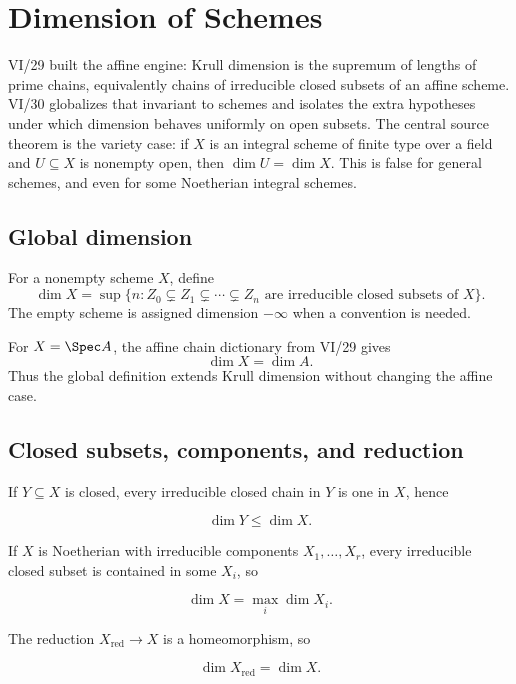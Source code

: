 \chapter{Dimension of Schemes}\label{ch:vi30-dimension-schemes}

VI/29 built the affine engine: Krull dimension is the supremum of lengths of prime chains, equivalently chains of
irreducible closed subsets of an affine scheme.  VI/30 globalizes that invariant to schemes and isolates the extra
hypotheses under which dimension behaves uniformly on open subsets.  The central source theorem is the variety case:
if $X$ is an integral scheme of finite type over a field and $U\subseteq X$ is nonempty open, then
$\dim U=\dim X$.  This is false for general schemes, and even for some Noetherian integral schemes.

\section{Global dimension}\label{sec:vi30-global-definition}
\begin{definition}\label{def:vi30-scheme-dimension}
For a nonempty scheme $X$, define
\[
\dim X=\sup\{n:Z_0\subsetneq Z_1\subsetneq\cdots\subsetneq Z_n
\text{ are irreducible closed subsets of }X\}.
\]
The empty scheme is assigned dimension $-\infty$ when a convention is needed.
\end{definition}
For $X=\Spec A$, the affine chain dictionary from VI/29 gives
\[
\dim X=\dim A.
\]
Thus the global definition extends Krull dimension without changing the affine case.


\section{Closed subsets, components, and reduction}\label{sec:vi30-closed-components}
If $Y\subseteq X$ is closed, every irreducible closed chain in $Y$ is one in $X$, hence
\begin{proposition}\label{prop:vi30-closed-inequality}
\[
\dim Y\leq \dim X.
\]
\end{proposition}
If $X$ is Noetherian with irreducible components $X_1,\ldots,X_r$, every irreducible closed subset is contained in
some $X_i$, so
\begin{proposition}\label{prop:vi30-components-max}
\[
\dim X=\max_i\dim X_i.
\]
\end{proposition}
The reduction $X_{\mathrm{red}}\to X$ is a homeomorphism, so
\begin{proposition}\label{prop:vi30-reduction}
\[
\dim X_{\mathrm{red}}=\dim X.
\]
\end{proposition}


